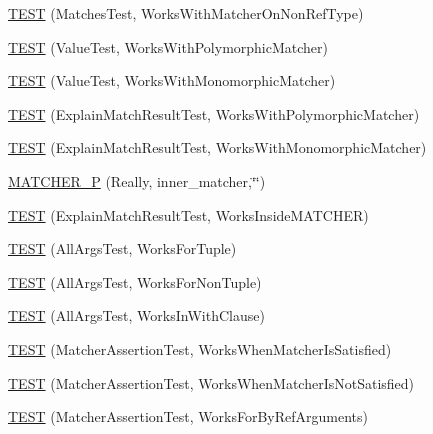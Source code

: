 \begin{DoxyCompactItemize}
\item 
\hyperlink{namespacetesting_1_1gmock__matchers__test_a9fd734ae5afb64a7285503bc0870c255}{T\+E\+ST} (Matches\+Test, Works\+With\+Matcher\+On\+Non\+Ref\+Type)
\item 
\hyperlink{namespacetesting_1_1gmock__matchers__test_a150118d4e990ba9fb9978329e742c931}{T\+E\+ST} (Value\+Test, Works\+With\+Polymorphic\+Matcher)
\item 
\hyperlink{namespacetesting_1_1gmock__matchers__test_a53403682e9ffc12152b0b1c7f55dfa12}{T\+E\+ST} (Value\+Test, Works\+With\+Monomorphic\+Matcher)
\item 
\hyperlink{namespacetesting_1_1gmock__matchers__test_a985e2bc1546b67de764d759de111e8e9}{T\+E\+ST} (Explain\+Match\+Result\+Test, Works\+With\+Polymorphic\+Matcher)
\item 
\hyperlink{namespacetesting_1_1gmock__matchers__test_aeff2711a03b27a66c1c98ed97ff49b09}{T\+E\+ST} (Explain\+Match\+Result\+Test, Works\+With\+Monomorphic\+Matcher)
\item 
\hyperlink{namespacetesting_1_1gmock__matchers__test_ae59dd69f7bc69e592dc851fef825d0ba}{M\+A\+T\+C\+H\+E\+R\+\_\+P} (Really, inner\+\_\+matcher,\char`\"{}\char`\"{})
\item 
\hyperlink{namespacetesting_1_1gmock__matchers__test_ae57edef8890da6b929dd0d21c2f7c071}{T\+E\+ST} (Explain\+Match\+Result\+Test, Works\+Inside\+M\+A\+T\+C\+H\+ER)
\item 
\hyperlink{namespacetesting_1_1gmock__matchers__test_aeea300647af4c7611f4e491cabcbf950}{T\+E\+ST} (All\+Args\+Test, Works\+For\+Tuple)
\item 
\hyperlink{namespacetesting_1_1gmock__matchers__test_aacc3ed6d6a0f9ff552019d0d58817b6f}{T\+E\+ST} (All\+Args\+Test, Works\+For\+Non\+Tuple)
\item 
\hyperlink{namespacetesting_1_1gmock__matchers__test_ad62534535946b2ef45457fb653f73a98}{T\+E\+ST} (All\+Args\+Test, Works\+In\+With\+Clause)
\item 
\hyperlink{namespacetesting_1_1gmock__matchers__test_ad37559f9112c04334a62ce9617cf1349}{T\+E\+ST} (Matcher\+Assertion\+Test, Works\+When\+Matcher\+Is\+Satisfied)
\item 
\hyperlink{namespacetesting_1_1gmock__matchers__test_a2f3755be7052d6e7769e3323053399d0}{T\+E\+ST} (Matcher\+Assertion\+Test, Works\+When\+Matcher\+Is\+Not\+Satisfied)
\item 
\hyperlink{namespacetesting_1_1gmock__matchers__test_afcf1287c7fd759157367026613ddd727}{T\+E\+ST} (Matcher\+Assertion\+Test, Works\+For\+By\+Ref\+Arguments)

\end{DoxyCompactItemize}
